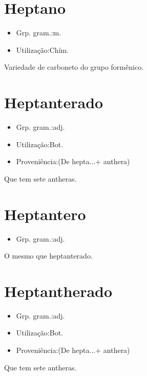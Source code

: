 \documentclass{article}
\begin{document}
\section{Heptano}
\begin{itemize}
\item {Grp. gram.:m.}
\end{itemize}
\begin{itemize}
\item {Utilização:Chím.}
\end{itemize}
Variedade de carboneto do grupo formênico.
\section{Heptanterado}
\begin{itemize}
\item {Grp. gram.:adj.}
\end{itemize}
\begin{itemize}
\item {Utilização:Bot.}
\end{itemize}
\begin{itemize}
\item {Proveniência:(De \textunderscore hepta...\textunderscore  + \textunderscore anthera\textunderscore )}
\end{itemize}
Que tem sete antheras.
\section{Heptantero}
\begin{itemize}
\item {Grp. gram.:adj.}
\end{itemize}
O mesmo que \textunderscore heptanterado\textunderscore .
\section{Heptantherado}
\begin{itemize}
\item {Grp. gram.:adj.}
\end{itemize}
\begin{itemize}
\item {Utilização:Bot.}
\end{itemize}
\begin{itemize}
\item {Proveniência:(De \textunderscore hepta...\textunderscore  + \textunderscore anthera\textunderscore )}
\end{itemize}
Que tem sete antheras.
\end{document}
